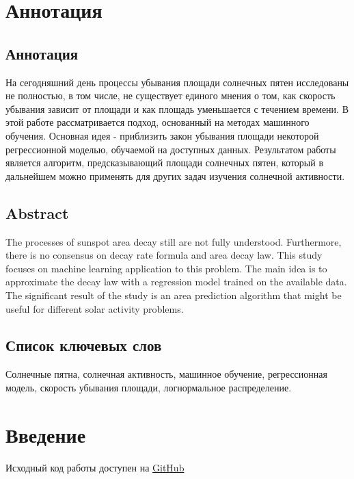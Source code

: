 \documentclass[a4paper, 12pt]{article}
\begin{document}

\newpage

\tableofcontents
\newpage

\section{Аннотация}

\subsection{Аннотация}

На сегодняшний день процессы убывания площади солнечных пятен исследованы не полностью, в том числе, не существует единого мнения о том, как скорость убывания зависит от площади и как площадь уменьшается с течением времени. В этой работе рассматривается подход, основанный на методах машинного обучения. Основная идея - приблизить закон убывания площади некоторой регрессионной моделью, обучаемой на доступных данных. Результатом работы является алгоритм, предсказывающий площади солнечных пятен, который в дальнейшем можно применять для других задач изучения солнечной активности.

\subsection{Abstract}

The processes of sunspot area decay still are not fully understood. Furthermore, there is no consensus on decay rate formula and area decay law. This study focuses on machine learning application to this problem. The main idea is to approximate the decay law with a regression model trained on the available data. The significant result of the study is an area prediction algorithm that might be useful for different solar activity problems.

\subsection{Список ключевых слов}

Солнечные пятна, солнечная активность, машинное обучение, регрессионная модель, скорость убывания площади, логнормальное распределение.

\newpage

\section{Введение}

Исходный код работы доступен на \href{https://github.com/isadrtdinov/Solar-Activity}{GitHub}
\end{document}
